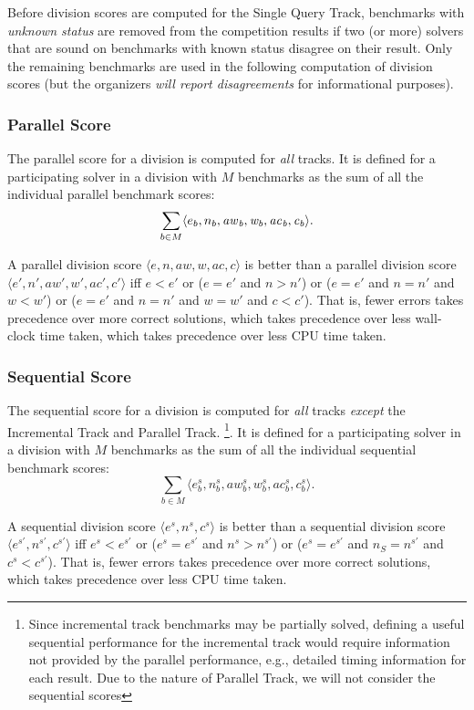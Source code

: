 \documentclass[12pt]{article}
\newcommand{\maintrack}{Single Query Track\xspace}
\newcommand{\inctrack}{Incremental Track\xspace}
\newcommand{\paralleltrack}{Parallel Track\xspace}
\begin{document}
Before division scores are computed for the \maintrack{},
benchmarks with \emph{unknown status} are removed from the competition results
if two (or more) solvers that are sound on benchmarks with known status
disagree on their result.
%
Only the remaining benchmarks are used in the following computation of division
scores (but the organizers \emph{will report disagreements} for informational
purposes).

\subsubsection{Parallel Score}

The parallel score for a division is computed for \emph{all} tracks.  It is
defined for a participating solver in a division with $M$ benchmarks as the sum
of all the individual parallel benchmark scores:
$$\sum_{b\in M} \langle e_b , n_b , \it{aw}_b, w_b, \it{ac}_b, c_b\rangle.$$

\noindent
A parallel division score $\langle
e, n, \mathit{aw}, w, \mathit{ac}, c\rangle$ is better than a parallel
division score\newline $\langle e', n', \mathit{aw}', w', \mathit{ac}', c'\rangle$
iff $e < e'$ or ($e = e'$ and $n
> n'$) or ($e = e'$ and $n = n'$ and $w < w'$) or ($e = e'$ and $n = n'$ and $w
= w'$ and $c < c'$).  That is, fewer errors takes precedence over more correct
solutions, which takes precedence over less wall-clock time taken, which takes
precedence over less CPU time taken.

\subsubsection{Sequential Score}

The sequential score for a division is computed for \emph{all} tracks
\emph{except} the \inctrack and \paralleltrack.
\footnote{Since incremental track benchmarks may be partially
solved, defining a useful sequential performance for the incremental track
would require information not provided by the parallel performance, e.g.,
detailed timing information for each result.  Due to the nature of
\paralleltrack, we will not consider the sequential
scores}.  It is defined for a
participating solver in a division with $M$ benchmarks as the sum of all the
individual sequential benchmark scores:
$$\sum_{b\in M} \langle e_b^s, n_b^s, \mathit{aw}_b^s, w_b^s, \mathit{ac}_b^s, c_b^s\rangle.$$

\noindent
A sequential division score $\langle e^s, n^s, c^s\rangle$ is better than a
sequential division score $\langle e^{s'}, n^{s'}, c^{s'}\rangle$ iff
$e^s < e^{s'}$ or ($e^s = e^{s'}$ and $n^s > n^{s'}$) or ($e^s = e^{s'}$ and
$n_S = n^{s'}$ and $c^s < c^{s'}$).
That is, fewer errors takes precedence over more correct solutions,
which takes precedence over less CPU time taken.
\end{document}
